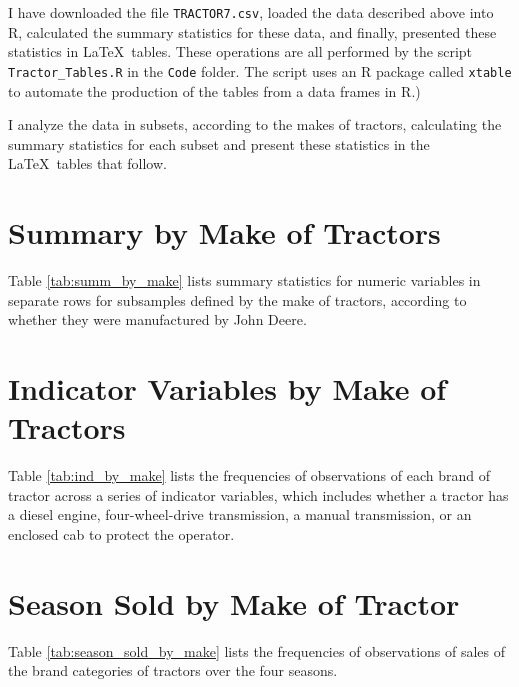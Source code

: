 \documentclass[11pt]{article}
\begin{document}
\bigskip
\noindent
I have downloaded the file {\tt TRACTOR7.csv}, 
loaded the data described above into 
\textsf{R}, 
calculated the summary statistics for these data, 
and finally, presented 
these statistics in \LaTeX\ tables.
These operations are all performed by the script 
{\tt Tractor\_Tables.R} in the {\tt Code} folder. 
The script uses an \textsf{R} package called {\tt xtable} 
to automate the
production of the tables from a data frames in \textsf{R}.)

\medskip
\noindent
I analyze the data in subsets, according to the makes of tractors, 
calculating the summary statistics for each subset and present these 
statistics in the \LaTeX\ tables that follow.

\vfill


\pagebreak
\section{Summary by Make of Tractors}

Table \ref{tab:summ_by_make} 
lists summary statistics for numeric variables
in separate rows for subsamples defined by the make of tractors, 
according to whether they were manufactured by John Deere. 




\pagebreak
\section{Indicator Variables by Make of Tractors}

Table \ref{tab:ind_by_make} lists the frequencies of observations of 
each brand of tractor across a series of indicator variables, 
which includes whether a tractor
has a diesel engine, four-wheel-drive transmission, a manual transmission, 
or an enclosed cab to protect the operator.






\pagebreak
\section{Season Sold by Make of Tractor}

Table \ref{tab:season_sold_by_make} lists the frequencies of observations of 
sales of the brand categories of tractors 
over the four seasons. 
\end{document}
